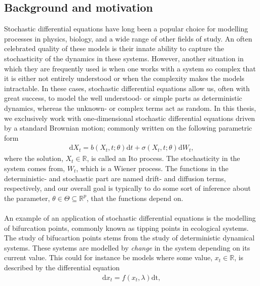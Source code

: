 \subsection{Background and motivation}
Stochastic differential equations have long been a popular choice for modelling processes in physics, biology, and a wide range of other fields of study. An often celebrated quality of these models is their innate ability to capture the stochasticity of the dynamics in these systems. However, another situation in which they are frequently used is when one works with a system so complex that it is either not entirely understood or when the complexity makes the models intractable. In these cases, stochastic differential equations allow us, often with great success, to model the well understood- or simple parts as deterministic dynamics, whereas the unknown- or complex terms act as random. In this thesis, we exclusively work with one-dimensional stochastic differential equations driven by a standard Brownian motion; commonly written on the following parametric form
\begin{align}
    \mathrm{d}X_t = b(X_t, t;\theta)\mathrm{d}t + \sigma\left(X_t, t; \theta\right)\mathrm{d}W_t,
\end{align}
where the solution, $X_t\in\mathbb{R}$, is called an Ito process. The stochasticity in the system comes from, $W_t$, which is a Wiener process. The functions in the deterministic- and stochastic part are named drift- and diffusion terms, respectively, and our overall goal is typically to do some sort of inference about the parameter, $\theta\in\Theta\subseteq\mathbb{R}^p$, that the functions depend on. \\\\
An example of an application of stochastic differential equations is the modelling of bifurcation points, commonly known as tipping points in ecological systems. The study of bifucartion points stems from the study of deterministic dynamical systems. These systems are modelled by \textit{change} in the system depending on its current value. This could for instance be models where some value, $x_t\in\mathbb{R}$, is described by the differential equation
\begin{align}
    \mathrm{d}x_t = f(x_t, \lambda)\mathrm{dt},
\end{align}
